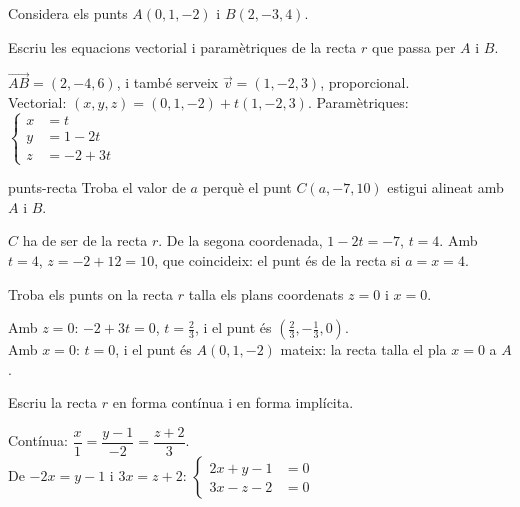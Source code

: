 Considera els punts $A(0,1,-2)$ i $B(2,-3,4)$.

\begin{apartats}

Escriu les equacions vectorial i paramètriques de la recta $r$ que passa per $A$ i $B$.

\begin{solucio}
$\overrightarrow{AB}=(2,-4,6)$, i també serveix $\vec v=(1,-2,3)$, proporcional.\\
Vectorial: $(x,y,z)=(0,1,-2)+t(1,-2,3)$.\quad
Paramètriques: $\left\{\begin{aligned}x&=t\\y&=1-2t\\z&=-2+3t\end{aligned}\right.$
\end{solucio}

\begin{tria}{punts-recta}
Troba el valor de $a$ perquè el punt $C(a,-7,10)$ estigui alineat amb $A$ i $B$.

\begin{solucio}
$C$ ha de ser de la recta $r$. De la segona coordenada, $1-2t=-7$, $t=4$. Amb $t=4$, $z=-2+12=10$, que
coincideix: el punt és de la recta si $a=x=4$.
\end{solucio}

Troba els punts on la recta $r$ talla els plans coordenats $z=0$ i $x=0$.

\begin{solucio}
Amb $z=0$: $-2+3t=0$, $t=\frac23$, i el punt és $\left(\frac23,-\frac13,0\right)$.\\
Amb $x=0$: $t=0$, i el punt és $A(0,1,-2)$ mateix: la recta talla el pla $x=0$ a $A$.
\end{solucio}
\end{tria}

\begin{nomesllarg}
Escriu la recta $r$ en forma contínua i en forma implícita.

\begin{solucio}
Contínua: $\dfrac{x}{1}=\dfrac{y-1}{-2}=\dfrac{z+2}{3}$.\\
De $-2x=y-1$ i $3x=z+2$:
$\left\{\begin{aligned}2x+y-1&=0\\3x-z-2&=0\end{aligned}\right.$
\end{solucio}
\end{nomesllarg}

\end{apartats}
